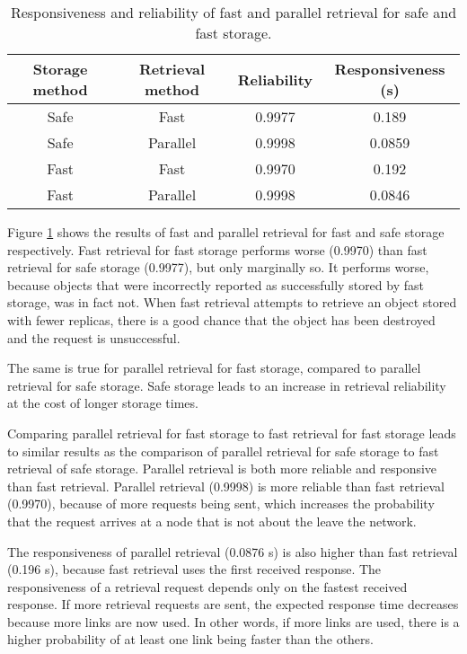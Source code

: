 \begin{table}[htbp]
\centering
\begin{tabular}{|c|c|c|c|}
\hline
Storage method & Retrieval method & Reliability & Responsiveness (s)\\
\hline
Safe           &   Fast           &   0.9977    &   0.189  \\
Safe           &   Parallel       &   0.9998    &   0.0859 \\
Fast           &   Fast           &   0.9970    &   0.192  \\
Fast           &   Parallel       &   0.9998    &   0.0846 \\
\hline
\end{tabular}
\caption{Responsiveness and reliability of fast and parallel retrieval for safe and fast storage.}
\label{tab_pithos_retrieval_results}
\end{table}
%
Figure \ref{tab_pithos_retrieval_results} shows the results of fast and parallel retrieval for fast and safe storage respectively. Fast retrieval for fast storage performs worse (0.9970) than fast retrieval for safe storage (0.9977), but only marginally so. It performs worse, because objects that were incorrectly reported as successfully stored by fast storage, was in fact not. When fast retrieval attempts to retrieve an object stored with fewer replicas, there is a good chance that the object has been destroyed and the request is unsuccessful.

The same is true for parallel retrieval for fast storage, compared to parallel retrieval for safe storage. Safe storage leads to an increase in retrieval reliability at the cost of longer storage times.

Comparing parallel retrieval for fast storage to fast retrieval for fast storage leads to similar results as the comparison of parallel retrieval for safe storage to fast retrieval of safe storage. Parallel retrieval is both more reliable and responsive than fast retrieval. Parallel retrieval (0.9998) is more reliable than fast retrieval (0.9970), because of more requests being sent, which increases the probability that the request arrives at a node that is not about the leave the network.

The responsiveness of parallel retrieval (0.0876 s) is also higher than fast retrieval (0.196 s), because fast retrieval uses the first received response. The responsiveness of a retrieval request depends only on the fastest received response. If more retrieval requests are sent, the expected response time decreases because more links are now used. In other words, if more links are used, there is a higher probability of at least one link being faster than the others.

